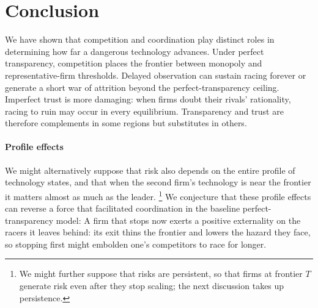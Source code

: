 \documentclass[12pt,reqno]{article}
\theoremstyle{definition} \newtheorem{example}{Example}
\theoremstyle{definition} \newtheorem{condition}{Condition}
\theoremstyle{definition} \newtheorem{corollary}{Corollary}
\theoremstyle{definition} \newtheorem{claim}{Claim}
\theoremstyle{definition} \newtheorem{definition}{Definition}
\theoremstyle{definition} \newtheorem{conjecture}{Conjecture}
\theoremstyle{definition} \newtheorem{Lemma}{Lemma}
\theoremstyle{definition} \newtheorem{lemma}{Lemma}
\theoremstyle{plain} \newtheorem{theorem}{Theorem}
\theoremstyle{definition} \newtheorem{assumption}{Assumption}
\theoremstyle{definition} \newtheorem*{assumptionnonumber}{Assumption}
\theoremstyle{definition} \newtheorem*{theoremNoNumber}{Proposition}
\theoremstyle{definition}
\theoremstyle{definition}\newtheorem{proposition}{Proposition}
\theoremstyle{definition} \newtheorem{result}{Result}
\theoremstyle{definition} \newtheorem*{definitionNoNumber}{Definition}
\theoremstyle{definition} \newtheorem{Definition}{Definition}
\theoremstyle{definition} \newtheorem*{DefinitionNoNumber}{Definition}
\theoremstyle{definition} \newtheorem*{fact}{Fact}
\theoremstyle{definition} \newtheorem*{property}{Property}
\theoremstyle{definition} \newtheorem{remark}{Remark}
\begin{document}
\section{Conclusion}
We have shown that competition and coordination play distinct roles in determining how far a dangerous technology advances. Under perfect transparency, competition places the frontier between monopoly and representative-firm thresholds. Delayed observation can sustain racing forever or generate a short war of attrition beyond the perfect-transparency ceiling. Imperfect trust is more damaging: when firms doubt their rivals' rationality, racing to ruin may occur in every equilibrium. Transparency and trust are therefore complements in some regions but substitutes in others.

\paragraph{Profile effects} We might alternatively suppose that risk also depends on the entire profile of technology states, and that when the  second firm's technology is  near the frontier it matters almost as much as the leader. \footnote{We might further suppose that risks are persistent, so that firms at frontier $T$ generate risk even after they stop scaling; the next discussion takes up persistence.} We conjecture that these profile effects can reverse a force that facilitated coordination in the baseline perfect-transparency model: A firm that stops now exerts a positive externality on the racers it leaves behind: its exit thins the frontier and lowers the hazard they face, so stopping first might embolden one's competitors to race for longer.
\end{document}
